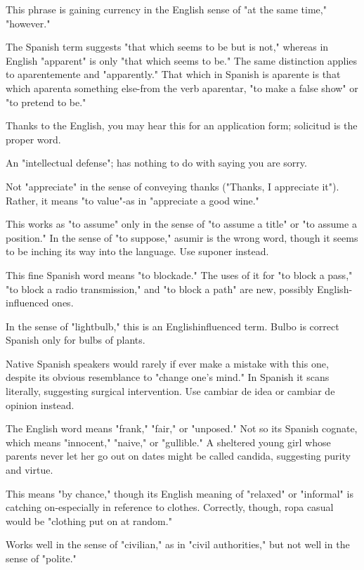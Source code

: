  This phrase is gaining currency in the English sense of "at the same time," "however."

 The Spanish term suggests "that which seems
to be but is not," whereas in English "apparent" is only "that which
seems to be." The same distinction applies to aparentemente and "apparently." That which in Spanish is aparente is that which aparenta
something else-from the verb aparentar, "to make a false show" or
"to pretend to be."

 Thanks to the English, you may hear this for an
application form; solicitud is the proper word.

 An "intellectual defense"; has nothing to do with
saying you are sorry.

 Not "appreciate" in the sense of conveying
thanks ("Thanks, I appreciate it"). Rather, it means "to value"-as
in "appreciate a good wine."

 This works as "to assume" only in the sense of "to
assume a title" or "to assume a position." In the sense of "to suppose,"
asumir is the wrong word, though it seems to be inching its way into
the language. Use suponer instead.

 This fine Spanish word means "to blockade."
The uses of it for "to block a pass," "to block a radio transmission,"
and "to block a path" are new, possibly English-influenced ones.

 In the sense of "lightbulb," this is an Englishinfluenced term. Bulbo is correct Spanish only for bulbs of plants.

 Native Spanish speakers would rarely if
ever make a mistake with this one, despite its obvious resemblance to
"change one's mind." In Spanish it scans literally, suggesting surgical
intervention. Use cambiar de idea or cambiar de opinion instead.

 The English word means "frank," "fair," or "unposed." Not so its Spanish cognate, which means "innocent," "naive,"
or "gullible." A sheltered young girl whose parents never let her go out
on dates might be called candida, suggesting purity and virtue.

 This means "by chance," though its English meaning of "relaxed" or "informal" is catching on-especially in reference
to clothes. Correctly, though, ropa casual would be "clothing put on at
random."

 Works well in the sense of "civilian," as in "civil authorities," but not well in the sense of "polite."

